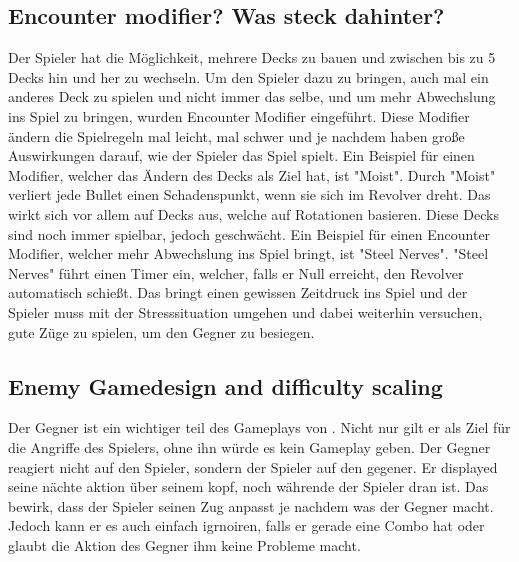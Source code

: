 \subsection{Encounter modifier? Was steck dahinter?}\label{subsec:placementMatters}

Der Spieler hat die Möglichkeit, mehrere Decks zu bauen und zwischen bis zu 5 Decks hin und her zu wechseln.
Um den Spieler dazu zu bringen, auch mal ein anderes Deck zu spielen und nicht immer das selbe, und um mehr
Abwechslung ins Spiel zu bringen, wurden Encounter Modifier eingeführt.
Diese Modifier ändern die Spielregeln mal leicht, mal schwer und je nachdem haben große Auswirkungen darauf, wie der Spieler das Spiel spielt.
Ein Beispiel für einen Modifier, welcher das Ändern des Decks als Ziel hat, ist "Moist". Durch "Moist" verliert jede Bullet einen Schadenspunkt, wenn sie sich im Revolver dreht.
Das wirkt sich vor allem auf Decks aus, welche auf Rotationen basieren. Diese Decks sind noch immer spielbar, jedoch geschwächt.
Ein Beispiel für einen Encounter Modifier, welcher mehr Abwechslung ins Spiel bringt, ist "Steel Nerves". "Steel Nerves" führt
einen Timer ein, welcher, falls er Null erreicht, den Revolver automatisch schießt. Das bringt einen gewissen Zeitdruck
ins Spiel und der Spieler muss mit der Stresssituation umgehen und dabei weiterhin versuchen, gute Züge zu spielen, um den Gegner zu besiegen. %

\subsection{Enemy Gamedesign and difficulty scaling}\label{subsec:placementMatters}

Der Gegner ist ein wichtiger teil des Gameplays von \FF. Nicht nur gilt er als Ziel für die Angriffe des Spielers, ohne ihn würde es kein Gameplay geben.
Der Gegner reagiert nicht auf den Spieler, sondern der Spieler auf den gegener. Er displayed seine nächte aktion über seinem kopf, noch währende der Spieler dran ist.
Das bewirk, dass der Spieler seinen Zug anpasst je nachdem was der Gegner macht. Jedoch kann er es auch einfach igrnoiren,
falls er gerade eine Combo hat oder glaubt die Aktion des Gegner ihm keine Probleme macht.


